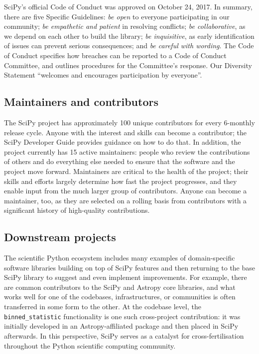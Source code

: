 \documentclass[fleqn,10pt]{wlscirep}
\begin{document}
SciPy's official Code of Conduct was approved on October 24, 2017. In summary, there are five Specific Guidelines:
\emph{be open} to everyone participating in our community;
\emph{be empathetic and patient} in resolving conflicts;
\emph{be collaborative}, as we depend on each other to build the library;
\emph{be inquisitive}, as early identification of issues can prevent serious consequences; and
\emph{be careful with wording}.
The Code of Conduct specifies how breaches can be reported to a Code of Conduct Committee, and outlines procedures for the Committee's response. Our Diversity Statement ``welcomes and encourages participation by everyone''.

\subsection*{Maintainers and contributors}

The SciPy project has approximately 100 unique contributors
for every 6-monthly release cycle. Anyone with the interest and
skills can become a contributor; the SciPy Developer
Guide\cite{scipy-dev-guide} provides guidance on how to do that.
In addition, the project currently has 15 active maintainers: people who review
the contributions of others and do everything else needed to ensure that the
software and the project move forward. Maintainers are critical to the health
of the project\cite{eghbal2016}; their skills and efforts largely determine how
fast the project progresses, and they enable input from the much
larger group of contributors. Anyone can become a maintainer, too, as they
are selected on a rolling basis from contributors with a significant history of
high-quality contributions.

\subsection*{Downstream projects}

The scientific Python ecosystem includes many examples
of domain-specific software libraries building on top
of SciPy features and then returning to the base SciPy library
to suggest and even implement improvements.
For example, there are common contributors to the SciPy and
Astropy core libraries\cite{astropy-2018}, and what works
well for one of the codebases, infrastructures, or communities
is often transferred in some form to the other. At the codebase
level, the \texttt{binned\_statistic} functionality
is one such cross-project contribution: it was initially
developed in an Astropy-affiliated package
and then placed in SciPy afterwards.
In this perspective, SciPy serves as a catalyst for cross-fertilisation
throughout the Python scientific computing community.
\end{document}
